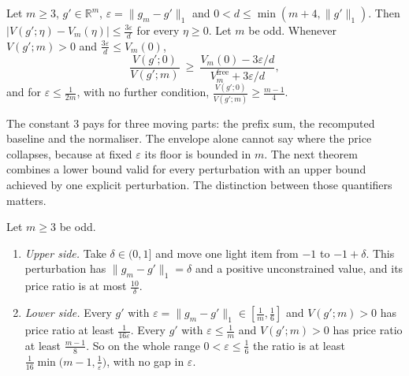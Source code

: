 \begin{theorem}[Envelope]
\label{thm:robust}
Let $m\ge3$, $g'\in\mathbb{R}^{m}$, $\varepsilon=\|g_{m}-g'\|_{1}$ and
$0<d\le\min(m+4,\|g'\|_{1})$. Then $|V(g';\eta)-V_{m}(\eta)|\le\frac{3\varepsilon}{d}$ for
every $\eta\ge0$. Let $m$ be odd. Whenever $V(g';m)>0$ and $\frac{3\varepsilon}{d}\le V_{m}(0)$,
\[
\frac{V(g';0)}{V(g';m)}\ \ge\ \frac{V_{m}(0)-3\varepsilon/d}{V^{\mathrm{free}}_{m}+3\varepsilon/d},
\]
and for $\varepsilon\le\frac{1}{2m}$, with no further condition,
$\frac{V(g';0)}{V(g';m)}\ge\frac{m-1}{4}$.
\end{theorem}


The constant $3$ pays for three moving parts: the prefix sum, the recomputed baseline and the
normaliser. The envelope alone cannot say where the price collapses, because at fixed
$\varepsilon$ its floor is bounded in $m$. The next theorem combines a lower bound valid for every perturbation with an upper bound
achieved by one explicit perturbation. The distinction between those quantifiers matters.

\begin{theorem}
\label{thm:collapse}
Let $m\ge3$ be odd.
\begin{enumerate}
\item[(a)] \emph{Upper side.} Take $\delta\in(0,1]$ and move one light item from $-1$ to
$-1+\delta$. This perturbation has $\|g_{m}-g'\|_{1}=\delta$ and a positive unconstrained
value, and its price ratio is at most $\frac{10}{\delta}$.
\item[(b)] \emph{Lower side.} Every $g'$ with $\varepsilon=\|g_{m}-g'\|_{1}\in[\frac1m,\frac16]$
and $V(g';m)>0$ has price ratio at least $\frac{1}{16\varepsilon}$. Every $g'$ with
$\varepsilon\le\frac1m$ and $V(g';m)>0$ has price ratio at least $\frac{m-1}{8}$. So on the
whole range $0<\varepsilon\le\frac16$ the ratio is at least
$\frac1{16}\min\bigl(m-1,\frac1\varepsilon\bigr)$, with no gap in $\varepsilon$.
\end{enumerate}
\end{theorem}


